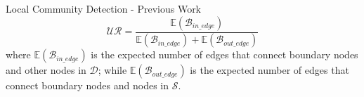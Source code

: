\documentclass[9pt]{beamer}
\begin{document}



    
    


\begin{frame}{Local Community Detection - Previous Work}
\begin{equation}
\mathcal{UR} = \frac{\mathbb{E}(\mathcal{B}_{in\_edge})}{\mathbb{E}(\mathcal{B}_{in\_edge})+\mathbb{E}(\mathcal{B}_{out\_edge})}
\end{equation}
where $\mathbb{E}(\mathcal{B}_{in\_edge})$ is the expected number of edges that connect boundary nodes and other nodes in $\mathcal{D}$; while $\mathbb{E}(\mathcal{B}_{out\_edge})$ is the expected number of edges that connect boundary nodes and nodes in $\mathcal{S}$.
\end{frame}
\end{document}
